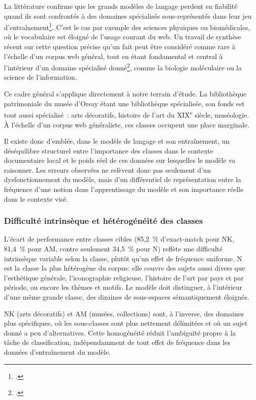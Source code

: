 La littérature confirme que les grands modèles de langage perdent en fiabilité quand ils sont confrontés à des domaines spécialisés sous-représentés dans leur jeu d'entraînement\footcite{kandpal2023}. C'est le cas par exemple des sciences physiques ou biomédicales, où le vocabulaire est éloigné de l'usage courant du web. Un travail de synthèse récent sur cette question précise qu'un fait peut être considéré comme rare à l'échelle d'un corpus web général, tout en étant fondamental et central à l'intérieur d'un domaine spécialisé donné\footcite{badhe2026}, comme la biologie moléculaire ou la science de l'information.

Ce cadre général s'applique directement à notre terrain d'étude. La bibliothèque patrimoniale du musée d'Orsay étant une bibliothèque spécialisée, son fonds est tout aussi spécialisé~: arts décoratifs, histoire de l'art du XIX\textsuperscript{e} siècle, muséologie. À l'échelle d'un corpus web généraliste, ces classes occupent une place marginale.

Il existe donc d'emblée, dans le modèle de langage et son entraînement, un déséquilibre structurel entre l'importance des classes dans le contexte documentaire local et le poids réel de ces données sur lesquelles le modèle va raisonner. Les erreurs observées ne relèvent donc pas seulement d'un dysfonctionnement du modèle, mais d'un différentiel de représentation entre la fréquence d'une notion dans l'apprentissage du modèle et son importance réelle dans le contexte visé.

\subsubsection*{Difficulté intrinsèque et hétérogénéité des classes}

L'écart de performance entre classes cibles (85,2~\% d'exact-match pour NK, 81,4~\% pour AM, contre seulement 34,5~\% pour N) reflète une difficulté intrinsèque variable selon la classe, plutôt qu'un effet de fréquence uniforme. N est la classe la plus hétérogène du corpus: elle couvre des sujets aussi divers que l'esthétique générale, l'iconographie religieuse, l'histoire de l'art par pays et par période, ou encore les thèmes et motifs. Le modèle doit distinguer, à l'intérieur d'une même grande classe, des dizaines de sous-espaces sémantiquement éloignés.

NK (arts décoratifs) et AM (musées, collections) sont, à l'inverse, des domaines plus spécifiques, où les sous-classes sont plus nettement délimitées et où un sujet donné a peu d'alternatives. Cette homogénéité réduit l'ambiguïté propre à la tâche de classification, indépendamment de tout effet de fréquence dans les données d'entraînement du modèle.


